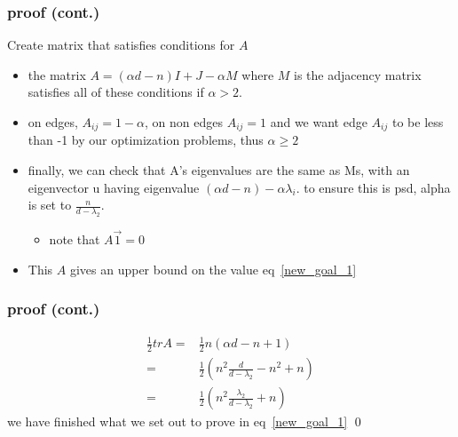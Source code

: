 \documentclass{beamer}
\begin{document}
\begin{frame}
    \frametitle{proof (cont.)}

    Create matrix that satisfies conditions for \(A\)
    \begin{itemize}
        \item the matrix \(A=(\alpha d-n)I + J -\alpha M\) where \(M\) is the adjacency matrix satisfies all of these conditions if \(\alpha>2\). 
    
        \item on edges, \(A_{ij} = 1-\alpha\), on non edges \(A_{ij} = 1\) and we want edge \(A_{ij}\) to be less than -1 by our optimization problems, thus \(\alpha\geq 2\)
        \item finally, we can check that A's eigenvalues are the same as Ms, with an eigenvector u having eigenvalue \((\alpha d-n)-\alpha\lambda_i\). to ensure this is psd, alpha is set to \(\frac{n}{d-\lambda_2}. \)
        \begin{itemize}
            \item note that \(A\vec 1 = 0\)
        \end{itemize}
        \item This \(A\) gives an upper bound on the value eq~\ref{new_goal_1}
    \end{itemize}

\end{frame}


\begin{frame}
    \frametitle{proof (cont.)}

    \begin{equation}
        \begin{split}
            \frac{1}{2}tr A=& \frac{1}{2}n(\alpha d-n+1)\\
            =&\frac{1}{2}\left( n^2\frac{d}{d-\lambda_2}-n^2+n \right)\\
            =& \frac{1}{2}\left( n^2\frac{\lambda_2}{d-\lambda
            _2} + n \right)
        \end{split}
    \end{equation}
    we have finished what we set out to prove in eq~\ref{new_goal_1}
    \qed

\end{frame}
\end{document}
